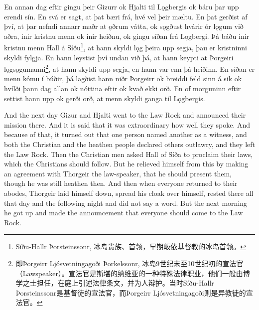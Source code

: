 \begin{paracol}{2}
    En annan dag eftir gingu þeir Gizurr ok Hjalti til Lǫgbergis ok báru þar upp erendi sín. En svá er sagt, at þat bæri frá, hvé vel þeir mæltu. En þat gerðist af því, at þar nefndi annarr maðr at ǫðrum vátta, ok sǫgðust hvárir ór lǫgum við aðra, inir kristnu menn ok inir heiðnu, ok gingu síðan frá Lǫgbergi. Þá báðu inir kristnu menn Hall á Síðu\footnote{Síðu-Hallr Þorsteinssonr, 冰岛贵族、首领，早期皈依基督教的冰岛首领。}, at hann skyldi lǫg þeira upp segja, þau er kristninni skyldi fylgja. En hann leystist því undan við þá, at hann keypti at Þorgeiri lǫgsǫgumanni\footnote{即Þorgeirr Ljósvetningagoði Þorkelssonr, 冰岛9世纪末至10世纪初的宣法官（Lawspeaker）。宣法官是斯堪的纳维亚的一种特殊法律职业，他们一般由博学之士担任，在庭上引述法律条文，并为人辩护。当时Síðu-Hallr Þorsteinssonr是基督徒的宣法官，而Þorgeirr Ljósvetningagoði则是异教徒的宣法官。}, at hann skyldi upp segja, en hann var enn þá heiðinn. En síðan er menn kómu í búðir, þá lagðist hann niðr Þorgeirr ok breiddi feld sinn á sik ok hvílði þann dag allan ok nóttina eftir ok kvað ekki orð. En of morguninn eftir settist hann upp ok gerði orð, at menn skyldi ganga til Lǫgbergis.
    \switchcolumn

    And the next day Gizur and Hjalti went to the Law Rock and announced their mission there. And it is said that it was extraordinary how well they spoke. And because of that, it turned out that one person named another as a witness, and both the Christian and the heathen people declared others outlawry, and they left the Law Rock. Then the Christian men asked Hall of Síða to proclaim their laws, which the Christians should follow. But he relieved himself from this by making an agreement with Thorgeir the law-speaker, that he should present them, though he was still heathen then. And then when everyone returned to their abodes, Thorgeir laid himself down, spread his cloak over himself, rested there all that day and the following night and did not say a word. But the next morning he got up and made the announcement that everyone should come to the Law Rock.
\end{paracol}

